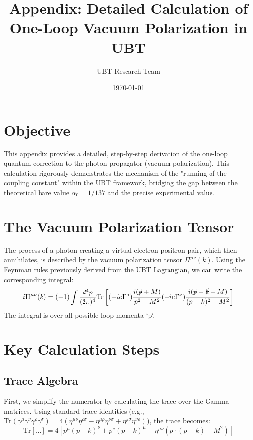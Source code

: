 \documentclass[12pt, a4paper]{article}
\title{\textbf{Appendix: Detailed Calculation of One-Loop Vacuum Polarization in UBT}}
\author{UBT Research Team}
\date{\today}
\begin{document}
\maketitle


\AlphaDerivationDisclaimer

\section{Objective}
This appendix provides a detailed, step-by-step derivation of the one-loop quantum correction to the photon propagator (vacuum polarization). This calculation rigorously demonstrates the mechanism of the "running of the coupling constant" within the UBT framework, bridging the gap between the theoretical bare value \( \alpha_0 = 1/137 \) and the precise experimental value.

\section{The Vacuum Polarization Tensor}
The process of a photon creating a virtual electron-positron pair, which then annihilates, is described by the vacuum polarization tensor \( \Pi^{\mu\nu}(k) \). Using the Feynman rules previously derived from the UBT Lagrangian, we can write the corresponding integral:
\begin{equation}
    i\Pi^{\mu\nu}(k) = (-1) \int \frac{d^4p}{(2\pi)^4} \text{Tr} \left[ (-ie\Gamma^\mu) \frac{i(\slashed{p} + M)}{p^2 - M^2} (-ie\Gamma^\nu) \frac{i(\slashed{p} - \slashed{k} + M)}{(p-k)^2 - M^2} \right]
    \label{eq:integral}
\end{equation}
The integral is over all possible loop momenta `p`.

\section{Key Calculation Steps}

\subsection{Trace Algebra}
First, we simplify the numerator by calculating the trace over the Gamma matrices. Using standard trace identities (e.g., \( \text{Tr}(\gamma^\mu \gamma^\nu \gamma^\rho \gamma^\sigma) = 4(\eta^{\mu\nu}\eta^{\rho\sigma} - \eta^{\mu\rho}\eta^{\nu\sigma} + \eta^{\mu\sigma}\eta^{\nu\rho}) \)), the trace becomes:
\begin{equation}
    \text{Tr}[...] = 4 \left[ p^\mu(p-k)^\nu + p^\nu(p-k)^\mu - \eta^{\mu\nu}(p \cdot (p-k) - M^2) \right]
\end{equation}
\end{document}
